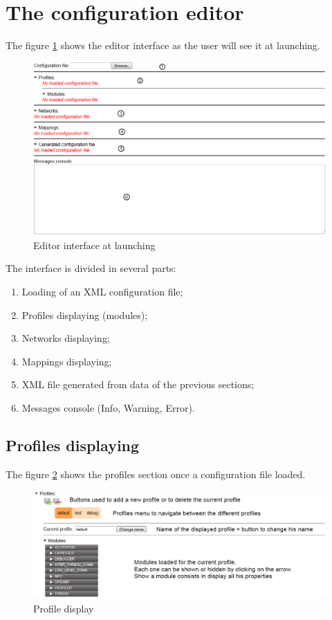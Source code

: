 \documentclass{article}
\begin{document}
\section{The configuration editor}

The figure \ref{fig:empty_editor} shows the editor interface as the user will see it at launching.

\begin{figure}[!h]
\includegraphics[width=\textwidth]{./pictures/empty_editor.png}
\caption{Editor interface at launching}
\label{fig:empty_editor}
\end{figure}

\noindent The interface is divided in several parts:
\begin{enumerate}
\item Loading of an XML configuration file;
\item Profiles displaying (modules);
\item Networks displaying;
\item Mappings displaying;
\item XML file generated from data of the previous sections;
\item Messages console (Info, Warning, Error).
\end{enumerate}

\subsection{Profiles displaying}

The figure \ref{fig:modules_editor} shows the profiles section once a configuration file loaded.

\begin{figure}[!h]
\includegraphics[width=\textwidth]{./pictures/modules_editor.png}
\caption{Profile display}
\label{fig:modules_editor}
\end{figure}
\end{document}
